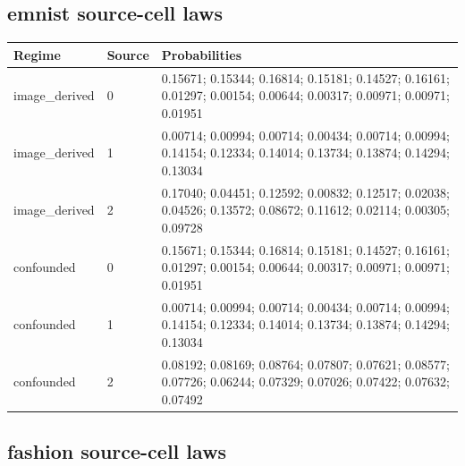 \reservetable
\subsection{emnist source-cell laws}

\begingroup\small
\setlength{\tabcolsep}{4pt}
\begin{longtable}{p{}p{}p{}}
\toprule

Regime & Source & Probabilities\\\midrule\endhead

image\_derived & 0 & 0.15671; 0.15344; 0.16814; 0.15181; 0.14527; 0.16161; 0.01297; 0.00154; 0.00644; 0.00317; 0.00971; 0.00971; 0.01951\\

image\_derived & 1 & 0.00714; 0.00994; 0.00714; 0.00434; 0.00714; 0.00994; 0.14154; 0.12334; 0.14014; 0.13734; 0.13874; 0.14294; 0.13034\\

image\_derived & 2 & 0.17040; 0.04451; 0.12592; 0.00832; 0.12517; 0.02038; 0.04526; 0.13572; 0.08672; 0.11612; 0.02114; 0.00305; 0.09728\\

confounded & 0 & 0.15671; 0.15344; 0.16814; 0.15181; 0.14527; 0.16161; 0.01297; 0.00154; 0.00644; 0.00317; 0.00971; 0.00971; 0.01951\\

confounded & 1 & 0.00714; 0.00994; 0.00714; 0.00434; 0.00714; 0.00994; 0.14154; 0.12334; 0.14014; 0.13734; 0.13874; 0.14294; 0.13034\\

confounded & 2 & 0.08192; 0.08169; 0.08764; 0.07807; 0.07621; 0.08577; 0.07726; 0.06244; 0.07329; 0.07026; 0.07422; 0.07632; 0.07492\\

\bottomrule
\end{longtable}
\endgroup

\reservetable
\subsection{fashion source-cell laws}

